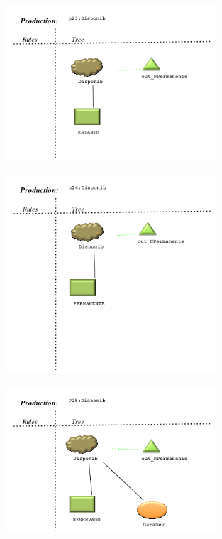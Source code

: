 \begin{figure}[!htb]
  \centering
    \includegraphics[width=0.7\textwidth]{./imagens/VisualLisa/__p23_Disponib.png}
\end{figure}
\begin{figure}[!htb]
  \centering
    \includegraphics[width=0.7\textwidth]{./imagens/VisualLisa/__p24_Disponib.png}
\end{figure}
\clearpage
\begin{figure}[!htb]
  \centering
    \includegraphics[width=0.7\textwidth]{./imagens/VisualLisa/__p25_Disponib.png}
\end{figure}
